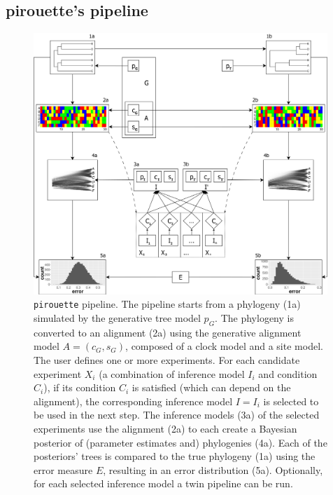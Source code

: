 \subsection{pirouette's pipeline}
\label{subsec:pipeline}

\begin{figure}
  \centering
  \includegraphics[width = 0.99\textwidth]{workflow4.png}
  \caption{
    \texttt{pirouette} pipeline.
    The pipeline starts from a phylogeny (1a) simulated by the 
    generative tree model 
    $\mathit{p_{G}}$.
    The phylogeny is converted to an alignment (2a) using the generative 
    alignment model 
    $\mathit{A} = (\mathit{c_{G}}, \mathit{s_{G}})$, composed of a clock model and a site model. 
    The user defines one or more experiments.
    For each candidate experiment $\mathit{X_{i}}$ 
    (a combination of inference model $\mathit{I_{i}}$ and condition $\mathit{C_{i}}$),
    if its condition $\mathit{C_{i}}$ is 
    satisfied (which can depend on the alignment), 
    the corresponding inference model $\mathit{I} = \mathit{I_{i}}$ is selected
    to be used in the next step.
    The inference models (3a) of the selected experiments use the alignment (2a) 
    to each create a Bayesian posterior of (parameter estimates and) 
    phylogenies (4a). 
    Each of the posteriors' trees is compared to the true phylogeny (1a) 
    using the error measure $\mathit{E}$, 
    resulting in an error distribution (5a). 
    Optionally, for each selected inference model a twin pipeline can be run.
}
\end{figure}
